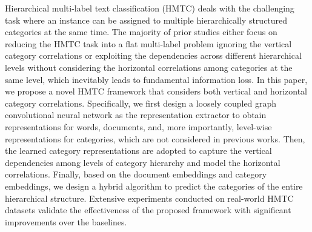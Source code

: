 Hierarchical multi-label text classification (HMTC) deals with the challenging task where an instance can be assigned to multiple hierarchically structured categories at the same time. The majority of prior studies either focus on reducing the HMTC task into a flat multi-label problem ignoring the vertical category correlations or exploiting the dependencies across different hierarchical levels without considering the horizontal correlations among categories at the same level, which inevitably leads to fundamental information loss. In this paper, we propose a novel HMTC framework that considers both vertical and horizontal category correlations. Specifically, we first design a loosely coupled graph convolutional neural network as the representation extractor to obtain representations for words, documents, and, more importantly, level-wise representations for categories, which are not considered in previous works. Then, the learned category representations are adopted to capture the vertical dependencies among levels of category hierarchy and model the horizontal correlations. Finally, based on the document embeddings and category embeddings, we design a hybrid algorithm to predict the categories of the entire hierarchical structure. Extensive experiments conducted on real-world HMTC datasets validate the effectiveness of the proposed framework with significant improvements over the baselines.
